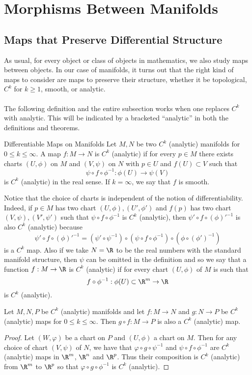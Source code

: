 \documentclass[a4paper]{article}
\begin{document}
\pagebreak
\section{Morphisms Between Manifolds}
\subsection{Maps that Preserve Differential Structure}
As usual, for every object or class of objects in mathematics, we also study maps between objects. In our case of manifolds, it turns out that the right kind of maps to consider are maps to preserve their structure, whether it be topological, $C^k$ for $k\geq 1$, smooth, or analytic. \\~\\

The following definition and the entire subsection works when one replaces $C^k$ with analytic. This will be indicated by a bracketed ``analytic'' in both the definitions and theorems. 

\begin{defn}{Differentiable Maps on Manifolds}{} Let $M,N$ be two $C^k$ (analytic) manifolds for $0\leq k\leq\infty$. A map $f:M\to N$ is $C^k$ (analytic) if for every $p\in M$ there exists charts $(U,\phi)$ on $M$ and $(V,\psi)$ on $N$ with $p\in U$ and $f(U)\subset V$ such that $$\psi\circ f\circ\phi^{-1}:\phi(U)\to\psi(V)$$ is $C^k$ (analytic) in the real sense. If $k=\infty$, we say that $f$ is smooth. 
\end{defn}

Notice that the choice of charts is independent of the notion of differentiability. Indeed, if $p\in M$ has two chart $(U,\phi),(U',\phi')$ and $f(p)$ has two chart $(V,\psi),(V',\psi')$ such that $\psi\circ f\circ\phi^{-1}$ is $C^k$ (analytic), then $\psi'\circ f\circ(\phi)'^{-1}$ is also $C^k$ (analytic) because $$\psi'\circ f\circ(\phi)'^{-1}=\left(\psi'\circ\psi^{-1}\right)\circ\left(\psi\circ f\circ\phi^{-1}\right)\circ\left(\phi\circ(\phi')^{-1}\right)$$ is a $C^k$ map. Also if we take $N=\R$ to be the real numbers with the standard manifold structure, then $\psi$ can be omitted in the definition and so we say that a function $f:M\to\R$ is $C^k$ (analytic) if for every chart $(U,\phi)$ of $M$ is such that $$f\circ\phi^{-1}:\phi(U)\subset\R^m\to\R$$ is $C^k$ (analytic). 

\begin{prp}{}{} Let $M,N,P$ be $C^k$ (analytic) manifolds and let $f:M\to N$ and $g:N\to P$ be $C^k$ (analytic) maps for $0\leq k\leq\infty$. Then $g\circ f:M\to P$ is also a $C^k$ (analytic) map. \tcbline
\begin{proof}
Let $(W,\varphi)$ be a chart on $P$ and $(U,\phi)$ a chart on $M$. Then for any choice of chart $(V,\psi)$ of $N$, we have that $\varphi\circ g\circ\psi^{-1}$ and $\psi\circ f\circ\phi^{-1}$ are $C^k$ (analytic) maps in $\R^m$, $\R^n$ and $\R^p$. Thus their composition is $C^k$ (analytic) from $\R^m$ to $\R^p$ so that $\varphi\circ g\circ\phi^{-1}$ is $C^k$ (analytic). 
\end{proof}
\end{prp}
\end{document}
